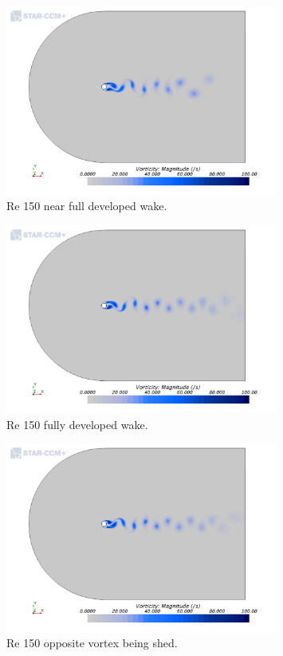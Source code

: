 \documentclass[10pt,english]{article}
\begin{document}
 \begin{figure}[h]
\centering
\includegraphics[trim={0.5cm 1.5cm 0.5cm .6cm},clip,width=0.8\textwidth]{nearfull}
\vspace{-5pt}
\caption{Re 150 near full developed wake.}
\label{f:nearfull}
\end{figure}

\vspace{-5pt}

 \begin{figure}[h]
\centering
\includegraphics[trim={0.5cm 1.5cm 0.5cm .6cm},clip,width=0.8\textwidth]{full}
\vspace{-5pt}
\caption{Re 150 fully developed wake.}
\label{f:full}
\end{figure}

\vspace{-5pt}

 \begin{figure}[t!]
\centering
\includegraphics[trim={0.5cm 1.5cm 0.5cm .6cm},clip,width=0.8\textwidth]{after}
\vspace{-5pt}
\caption{Re 150 opposite vortex being shed.}
\label{f:after}
\end{figure}
\end{document}
